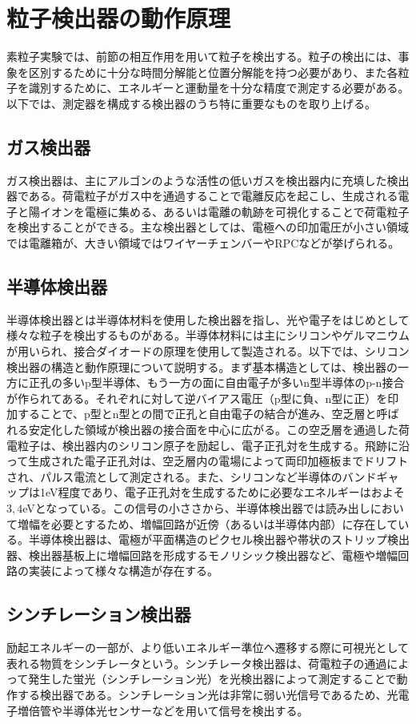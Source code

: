\section{粒子検出器の動作原理}
 素粒子実験では、前節の相互作用を用いて粒子を検出する。粒子の検出には、事象を区別するために十分な時間分解能と位置分解能を持つ必要があり、また各粒子を識別するために、エネルギーと運動量を十分な精度で測定する必要がある。以下では、測定器を構成する検出器のうち特に重要なものを取り上げる。

\subsection{ガス検出器}
 ガス検出器は、主にアルゴンのような活性の低いガスを検出器内に充填した検出器である。荷電粒子がガス中を通過することで電離反応を起こし、生成される電子と陽イオンを電極に集める、あるいは電離の軌跡を可視化することで荷電粒子を検出することができる。主な検出器としては、電極への印加電圧が小さい領域では電離箱が、大きい領域ではワイヤーチェンバーやRPCなどが挙げられる。

\subsection{半導体検出器}
 半導体検出器とは半導体材料を使用した検出器を指し、光や電子をはじめとして様々な粒子を検出するものがある。半導体材料には主にシリコンやゲルマニウムが用いられ、接合ダイオードの原理を使用して製造される。以下では、シリコン検出器の構造と動作原理について説明する。まず基本構造としては、検出器の一方に正孔の多いp型半導体、もう一方の面に自由電子が多いn型半導体のp-n接合が作られてある。それぞれに対して逆バイアス電圧（p型に負、n型に正）を印加することで、p型とn型との間で正孔と自由電子の結合が進み、空乏層と呼ばれる安定化した領域が検出器の接合面を中心に広がる。この空乏層を通過した荷電粒子は、検出器内のシリコン原子を励起し、電子正孔対を生成する。飛跡に沿って生成された電子正孔対は、空乏層内の電場によって両印加極板までドリフトされ、パルス電流として測定される。また、シリコンなど半導体のバンドギャップは1eV程度であり、電子正孔対を生成するために必要なエネルギーはおよそ$3,4$eVとなっている。この信号の小ささから、半導体検出器では読み出しにおいて増幅を必要とするため、増幅回路が近傍（あるいは半導体内部）に存在している。半導体検出器は、電極が平面構造のピクセル検出器や帯状のストリップ検出器、検出器基板上に増幅回路を形成するモノリシック検出器など、電極や増幅回路の実装によって様々な構造が存在する。

\subsection{シンチレーション検出器}
 励起エネルギーの一部が、より低いエネルギー準位へ遷移する際に可視光として表れる物質をシンチレータという。シンチレータ検出器は、荷電粒子の通過によって発生した蛍光（シンチレーション光）を光検出器によって測定することで動作する検出器である。シンチレーション光は非常に弱い光信号であるため、光電子増倍管や半導体光センサーなどを用いて信号を検出する。
 
